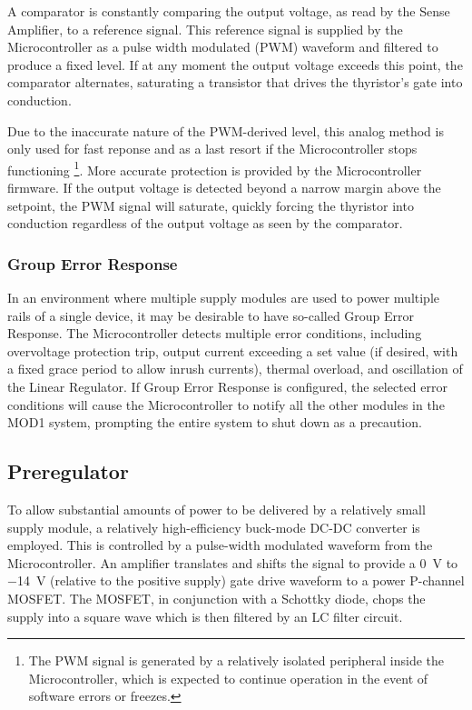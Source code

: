 \documentclass[letterpaper,twocolumn,10pt,openany,oneside,final,fleqn]{memoir}
\begin{document}
A comparator is constantly comparing the output voltage, as read by the Sense Amplifier,
to a reference signal. This reference signal is supplied by the Microcontroller as a
pulse width modulated (PWM) waveform and filtered to produce a fixed level. If at any moment
the output voltage exceeds this point, the comparator alternates, saturating a transistor
that drives the thyristor's gate into conduction.

Due to the inaccurate nature of the PWM-derived level, this analog method is only used
for fast reponse and as a last resort if the Microcontroller stops functioning
\footnote{The PWM signal is generated by a relatively isolated peripheral inside the
    Microcontroller, which is expected to continue operation in the event of software
    errors or freezes.}.
More accurate protection is provided by the Microcontroller firmware. If the output
voltage is detected beyond a narrow margin above the setpoint, the PWM signal will
saturate, quickly forcing the thyristor into conduction regardless of the output
voltage as seen by the comparator.

\subsubsection{Group Error Response}

In an environment where multiple supply modules are used to power multiple rails of a
single device, it may be desirable to have so-called Group Error Response. The
Microcontroller detects multiple error conditions, including overvoltage protection trip,
output current exceeding a set value (if desired, with a fixed grace period to allow
inrush currents), thermal overload, and oscillation of the Linear
Regulator. If Group Error Response is configured, the selected error conditions will
cause the Microcontroller to notify all the other modules in the MOD1 system, prompting
the entire system to shut down as a precaution.

\subsection{Preregulator}

To allow substantial amounts of power to be delivered by a relatively small supply module,
a relatively high-efficiency buck-mode DC-DC converter is employed. This is controlled by
a pulse-width modulated waveform from the Microcontroller. An amplifier translates and shifts
the signal to provide a \SI{0}{V} to \SI{-14}{V} (relative to the positive supply) gate
drive waveform to a power P-channel MOSFET. The MOSFET, in conjunction with a Schottky
diode, chops the supply into a square wave which is then filtered by an LC filter circuit.
\end{document}
